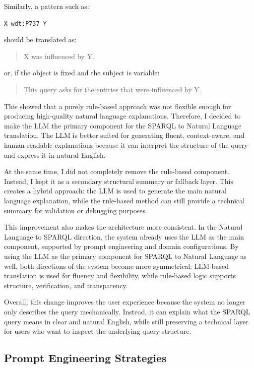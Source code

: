 \documentclass[11pt,a4paper]{article}
\begin{document}
Similarly, a pattern such as:

\begin{center}
\texttt{X wdt:P737 Y}
\end{center}

should be translated as:

\begin{quote}
X was influenced by Y.
\end{quote}

or, if the object is fixed and the subject is variable:

\begin{quote}
This query asks for the entities that were influenced by Y.
\end{quote}

This showed that a purely rule-based approach was not flexible enough for producing high-quality natural language explanations. Therefore, I decided to make the LLM the primary component for the SPARQL to Natural Language translation. The LLM is better suited for generating fluent, context-aware, and human-readable explanations because it can interpret the structure of the query and express it in natural English.

At the same time, I did not completely remove the rule-based component. Instead, I kept it as a secondary structural summary or fallback layer. This creates a hybrid approach: the LLM is used to generate the main natural language explanation, while the rule-based method can still provide a technical summary for validation or debugging purposes.

This improvement also makes the architecture more consistent. In the Natural Language to SPARQL direction, the system already uses the LLM as the main component, supported by prompt engineering and domain configurations. By using the LLM as the primary component for SPARQL to Natural Language as well, both directions of the system become more symmetrical: LLM-based translation is used for fluency and flexibility, while rule-based logic supports structure, verification, and transparency.

Overall, this change improves the user experience because the system no longer only describes the query mechanically. Instead, it can explain what the SPARQL query means in clear and natural English, while still preserving a technical layer for users who want to inspect the underlying query structure.



\subsection{Prompt Engineering Strategies}
\label{sec:prompts}
\end{document}
